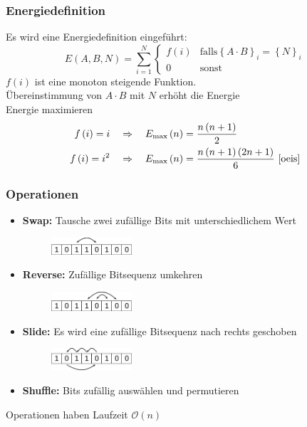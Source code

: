 \begin{frame}
  \frametitle{Energiedefinition}
  Es wird eine Energiedefinition eingeführt:
  \begin{equation*}
    E\left(A,B,N\right)=\sum\limits_{i=1}^N\begin{cases}f\left(i\right) & \mathrm{falls} {\left\{A\cdot B\right\}}_i={\left\{N\right\}}_i \\ 0 & \mathrm{sonst}\end{cases}
  \end{equation*}
  \pause{}
  $f\left(i\right)$ ist eine monoton steigende Funktion. \\
  \Rightarrow{} Übereinstimmung von $A\cdot B$ mit $N$ erhöht die Energie \\
  \Rightarrow{} Energie maximieren
  \pause{}
  \begin{align*}
    f\left(i\right)=i \quad&\Rightarrow\quad E_\mathrm{\max}\left(n\right)=\frac{n\left(n+1\right)}{2} \\
    f\left(i\right)=i^2 \quad&\Rightarrow\quad E_\mathrm{\max}\left(n\right)=\frac{n\left(n+1\right)\left(2n+1\right)}{6}\text{~\cite{oeis}}
  \end{align*}
\end{frame}

\begin{frame}
  \frametitle{Operationen}
  \begin{itemize}
    \setlength{\itemsep}{5pt}
    \item\textbf{Swap:} Tausche zwei zufällige Bits mit unterschiedlichem Wert
      \begin{figure}[H]
        \centering
        \includegraphics[width=3cm]{fig/bits-swap.png}
      \end{figure}
      \pause{}
    \item\textbf{Reverse:} Zufällige Bitsequenz umkehren
      \begin{figure}[H]
        \centering
        \includegraphics[width=3cm]{fig/bits-reverse.png}
      \end{figure}
      \pause{}
    \item\textbf{Slide:} Es wird eine zufällige Bitsequenz nach rechts geschoben
      \begin{figure}[H]
        \centering
        \includegraphics[width=3cm]{fig/bits-slide.png}
      \end{figure}
      \pause{}
    \item\textbf{Shuffle:} Bits zufällig auswählen und permutieren
  \end{itemize}
  Operationen haben Laufzeit $\mathcal{O}\left(n\right)$
\end{frame}

